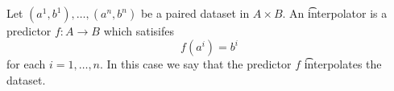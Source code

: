 


Let $(a^1, b^1), \dots, (a^n, b^n)$ be a paired dataset in $A \times B$.
An \t{interpolator} is a predictor $f: A \to B$ which satisifes
\[
  f(a^i) = b^i
\]
for each $i = 1 , \dots, n$.
In this case we say that the predictor $f$ \t{interpolates} the dataset.

\blankpage
